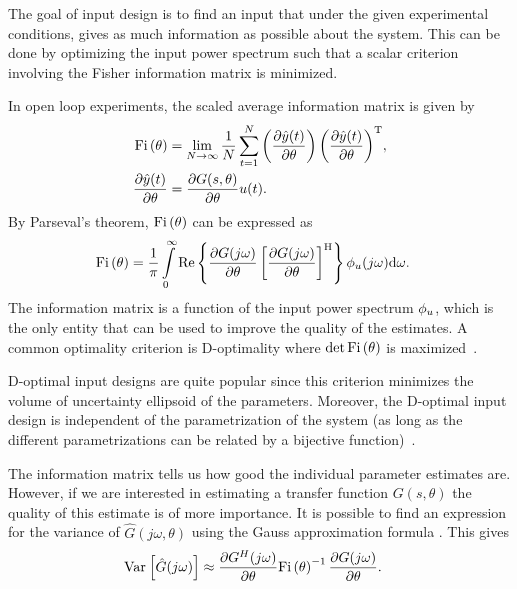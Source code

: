 The goal of input design is to find an input that under the given experimental conditions, gives as much information as possible about the system.
This can be done by optimizing the input power spectrum such that  a scalar criterion involving the Fisher information matrix is minimized.

In open loop experiments, the scaled average information matrix is given by
\begin{align}
\mathrm{Fi} \left(\theta\right) & = \lim_{N\rightarrow\infty}
          \frac{1}{N}
            \sum_{t=1}^{N}
              {\left(\frac{\partial\hat{y}(t)}{\partial\theta}\right)
               \left(\frac{\partial\hat{y}(t)}{\partial\theta}\right)^{\mathrm{T}}},\\
\frac{\partial\hat{y}(t)}{\partial\theta}
    & =\frac{\partial G(s,\theta)}{\partial \theta}u(t).
\end{align}
By Parseval's theorem, $\mathrm{Fi} \left(\theta\right)$ can be expressed as
\begin{align}
\mathrm{Fi} \left(\theta\right) &= \frac{1}{\pi}
         \int\limits_0^\infty \mathrm{Re}
           \left\{      \frac{\partial G(j\omega)}{\partial \theta}
                  \left[\frac{\partial G(j\omega)}{\partial \theta}\right]^{\mathrm{H}}
           \right\}
           \phi_{u}(j\omega)
           \mathrm{d}{\omega} \text{.}
\label{eq:excitation:IF}
\end{align}
The information matrix is a function of the input power spectrum $\phi_{u}$, which is the only entity that can be used to improve the quality of the estimates. 
A common optimality criterion is D-optimality where $\det{\ensuremath{\mathrm{Fi} \left(\theta\right)}}$ is maximized~\citep{Goodwin1977}.

\begin{remark}
D-optimal input designs are quite popular since this criterion minimizes the volume of uncertainty ellipsoid of the parameters.
Moreover, the D-optimal input design is independent of the parametrization of the system (as long as the different parametrizations can be related by a bijective function)~\citep[Chapter 6]{Goodwin1977}.
\end{remark}

The information matrix tells us how good the individual parameter estimates are. However, if we are interested in estimating a transfer function $G(s,\theta)$ the quality of this estimate is of more importance. 
It is possible to find an expression for the variance of $\hat{G}(j\omega,\theta)$ using the Gauss approximation formula \citep{Ljung1999, Pintelon2012}. This gives
\begin{align}
\operatorname{\mathrm{Var}}_{} \left[ \hat{G}(j\omega) \right] &\approx \frac{\partial G^H(j\omega)}{\partial \theta}\mathrm{Fi} \left(\theta\right)^{-1}\frac{\partial G(j\omega)}{\partial \theta}.
\label{eq:excitation:varG}
\end{align}

